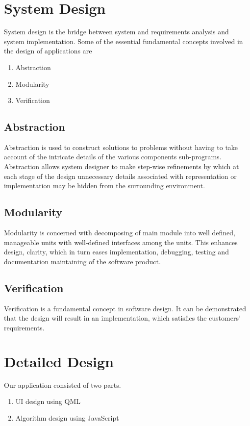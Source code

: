 \documentclass[a4paper,12pt]{article}
\begin{document}
\section{System Design}
\hspace{18pt}System design is the bridge between system and requirements analysis and system implementation. Some of the essential fundamental concepts involved in the design of applications are
\begin{enumerate}
 \item Abstraction 
 \item Modularity
 \item Verification
\end{enumerate}

\subsection{Abstraction}
Abstraction is used to construct solutions to problems without having to take account of the intricate details of the various components sub-programs. Abstraction allows system designer to make step-wise refinements by which at each stage of the design unnecessary details associated with representation or implementation may be hidden from the surrounding environment.

\subsection{Modularity}
Modularity is concerned with decomposing of main module into well defined, manageable units with well-defined interfaces among the units. This enhances design, clarity, which in turn eases implementation, debugging, testing and documentation maintaining of the software product. 

\subsection{Verification}
Verification is a fundamental concept in software design. It can be demonstrated that the design will result in an implementation, which satisfies the customers' requirements.



\section{Detailed Design}
\hspace{18pt}Our application consisted of two parts.
\begin{enumerate}
 \item UI design using QML
 \item Algorithm design using JavaScript
\end{enumerate}
\end{document}
